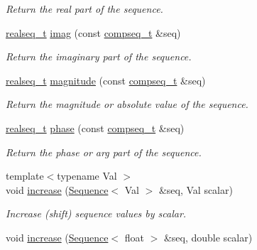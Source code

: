 \begin{DoxyCompactItemize}
\begin{DoxyCompactList}\small\item\em Return the real part of the sequence. \end{DoxyCompactList}\item 
\hyperlink{namespace_wire_cell_1_1_waveform_a479175e541c8545e87cd8063b74b6956}{realseq\+\_\+t} \hyperlink{namespace_wire_cell_1_1_waveform_acc803e535b3e979dc331088b9fba8bc1}{imag} (const \hyperlink{namespace_wire_cell_1_1_waveform_a7e4a8d371f774438bb360e7d1dcb583a}{compseq\+\_\+t} \&seq)
\begin{DoxyCompactList}\small\item\em Return the imaginary part of the sequence. \end{DoxyCompactList}\item 
\hyperlink{namespace_wire_cell_1_1_waveform_a479175e541c8545e87cd8063b74b6956}{realseq\+\_\+t} \hyperlink{namespace_wire_cell_1_1_waveform_ae8dc1c86082f99f8cbfedb8434d22bc2}{magnitude} (const \hyperlink{namespace_wire_cell_1_1_waveform_a7e4a8d371f774438bb360e7d1dcb583a}{compseq\+\_\+t} \&seq)
\begin{DoxyCompactList}\small\item\em Return the magnitude or absolute value of the sequence. \end{DoxyCompactList}\item 
\hyperlink{namespace_wire_cell_1_1_waveform_a479175e541c8545e87cd8063b74b6956}{realseq\+\_\+t} \hyperlink{namespace_wire_cell_1_1_waveform_abcab023facead1d0eb14e2042ce578bb}{phase} (const \hyperlink{namespace_wire_cell_1_1_waveform_a7e4a8d371f774438bb360e7d1dcb583a}{compseq\+\_\+t} \&seq)
\begin{DoxyCompactList}\small\item\em Return the phase or arg part of the sequence. \end{DoxyCompactList}\item 
{\footnotesize template$<$typename Val $>$ }\\void \hyperlink{namespace_wire_cell_1_1_waveform_af74deccaeb9e2147865029e16840e799}{increase} (\hyperlink{namespace_wire_cell_1_1_waveform_a1d2a1b672e3b220dcd64a994531de95d}{Sequence}$<$ Val $>$ \&seq, Val scalar)
\begin{DoxyCompactList}\small\item\em Increase (shift) sequence values by scalar. \end{DoxyCompactList}\item 
void \hyperlink{namespace_wire_cell_1_1_waveform_a3e92e2c63b937617bf8870412e7a6da7}{increase} (\hyperlink{namespace_wire_cell_1_1_waveform_a1d2a1b672e3b220dcd64a994531de95d}{Sequence}$<$ float $>$ \&seq, double scalar)

\end{DoxyCompactItemize}
